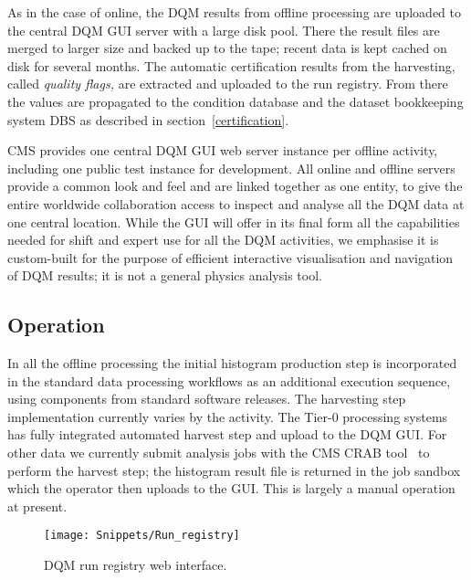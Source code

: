 \documentclass[a4paper]{jpconf}
\begin{document}
As in the case of online, the DQM results from offline processing are uploaded
to the central DQM GUI server with a large disk pool.  There the result files
are merged to larger size and backed up to the tape; recent data is kept
cached on disk for several months.  The automatic certification results from
the harvesting, called {\em quality flags,} are extracted and uploaded to the
run registry.  From there the values are propagated to the condition database
and the dataset bookkeeping system DBS as described in
section~\ref{certification}.

CMS provides one central DQM GUI web server instance per offline activity,
including one public test instance for development.  All online and offline
servers provide a common look and feel and are linked together as one entity,
to give the entire worldwide collaboration access to inspect and analyse all
the DQM data at one central location.  While the GUI will offer in its final
form all the capabilities needed for shift and expert use for all the DQM
activities, we emphasise it is custom-built for the purpose of efficient
interactive visualisation and navigation of DQM results; it is not a general
physics analysis tool.

\subsection{Operation}

In all the offline processing the initial histogram production step is
incorporated in the standard data processing workflows as an additional
execution sequence, using components from standard software releases.  The
harvesting step implementation currently varies by the activity.  The Tier-0
processing systems has fully integrated automated harvest step and upload to
the DQM GUI.  For other data we currently submit analysis jobs with the CMS
CRAB tool~\cite{cms_crab_07} to perform the harvest step; the histogram
result file is returned in the job sandbox which the operator then uploads
to the GUI.  This is largely a manual operation at present.


\begin{figure}[!tbp]
\begin{center}
\texttt{[image: Snippets/Run\_registry]}
\caption{\label{fig:runregistry}DQM run registry web interface.}
\end{center}
\end{figure}
\end{document}
